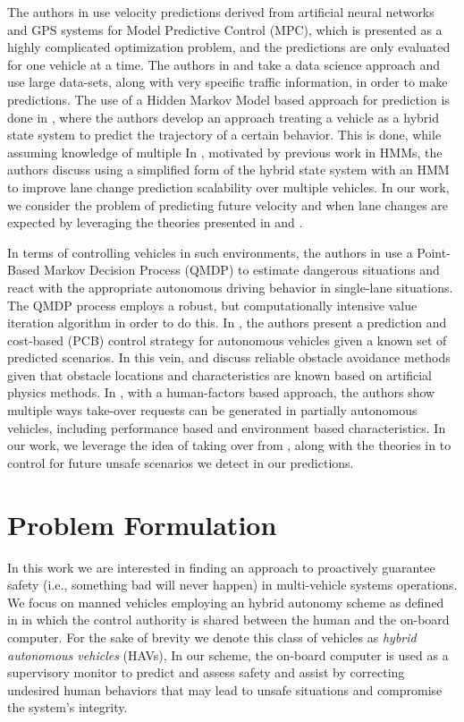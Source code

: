 \documentclass[letterpaper, 10 pt, conference]{ieeeconf}  %
\begin{document}
The authors in \cite{mpc} use velocity predictions derived from artificial neural networks and GPS systems for Model Predictive Control (MPC), which is presented as a highly complicated optimization problem, and the predictions are only evaluated for one vehicle at a time. The authors in \cite{velnn} and \cite{veldatadriv} take a data science approach and use large data-sets, along with very specific traffic information, in order to make predictions. The use of a Hidden Markov Model based approach for prediction is done in \cite{lanhmm}, where the authors develop an approach treating a vehicle as a hybrid state system to predict the trajectory of a certain behavior. This is done, while assuming knowledge of multiple In \cite{woohmm}, motivated by previous work in HMMs, the authors discuss using a simplified form of the hybrid state system with an HMM to improve lane change prediction scalability over multiple vehicles. In our work, we consider the problem of predicting future velocity and when lane changes are expected by leveraging the theories presented in \cite{mpc} and \cite{woohmm}. 

In terms of controlling vehicles in such environments, the authors in \cite{qmdp} use a Point-Based Markov Decision Process (QMDP) to estimate dangerous situations and react with the appropriate autonomous driving behavior in single-lane situations. The QMDP process employs a robust, but computationally intensive value iteration algorithm in order to do this. In \cite{predcost}, the authors present a prediction and cost-based (PCB) control strategy for autonomous vehicles given a known set of predicted scenarios. In this vein, \cite{vfh+} and \cite{vfh*} discuss reliable obstacle avoidance methods given that obstacle locations and characteristics are known based on artificial physics methods. In \cite{takeover}, with a human-factors based approach, the authors show multiple ways take-over requests can be generated in partially autonomous vehicles, including performance based and environment based characteristics. In our work, we leverage the idea of taking over from \cite{takeover}, along with the theories in \cite{vfh*} to control for future unsafe scenarios we detect in our predictions.

    
\section{Problem Formulation} \label{sec:probform}
 
In this work we are interested in finding an approach to proactively guarantee safety (i.e., something bad will never happen) in multi-vehicle systems operations. We focus on manned vehicles employing an hybrid autonomy scheme as defined in \cite{} in which the control authority is shared between the human and the on-board computer. For the sake of brevity we denote this class of vehicles as {\em hybrid autonomous vehicles} (HAVs), In our scheme, the on-board computer is used as a supervisory monitor to predict and assess safety and assist by correcting undesired human behaviors that may lead to unsafe situations and compromise the system's integrity. 
\end{document}
